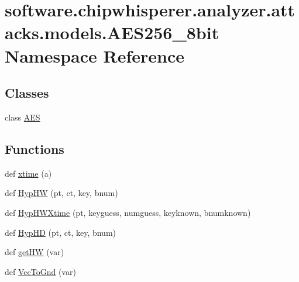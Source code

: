 \hypertarget{namespacesoftware_1_1chipwhisperer_1_1analyzer_1_1attacks_1_1models_1_1AES256__8bit}{}\section{software.\+chipwhisperer.\+analyzer.\+attacks.\+models.\+A\+E\+S256\+\_\+8bit Namespace Reference}
\label{namespacesoftware_1_1chipwhisperer_1_1analyzer_1_1attacks_1_1models_1_1AES256__8bit}
\subsection*{Classes}
\begin{DoxyCompactItemize}
\item 
class \hyperlink{classsoftware_1_1chipwhisperer_1_1analyzer_1_1attacks_1_1models_1_1AES256__8bit_1_1AES}{A\+E\+S}
\end{DoxyCompactItemize}
\subsection*{Functions}
\begin{DoxyCompactItemize}
\item 
def \hyperlink{namespacesoftware_1_1chipwhisperer_1_1analyzer_1_1attacks_1_1models_1_1AES256__8bit_a096a7aee640b9fd3b4af6bd8e2bdb892}{xtime} (a)
\item 
def \hyperlink{namespacesoftware_1_1chipwhisperer_1_1analyzer_1_1attacks_1_1models_1_1AES256__8bit_aeed3429f331415549b3d6a0df13a3f00}{Hyp\+H\+W} (pt, ct, key, bnum)
\item 
def \hyperlink{namespacesoftware_1_1chipwhisperer_1_1analyzer_1_1attacks_1_1models_1_1AES256__8bit_a1fc9d650283b04236c62962864126fe0}{Hyp\+H\+W\+Xtime} (pt, keyguess, numguess, keyknown, bnumknown)
\item 
def \hyperlink{namespacesoftware_1_1chipwhisperer_1_1analyzer_1_1attacks_1_1models_1_1AES256__8bit_a6d73aa3d64074fad4ae5cda6a45e9586}{Hyp\+H\+D} (pt, ct, key, bnum)
\item 
def \hyperlink{namespacesoftware_1_1chipwhisperer_1_1analyzer_1_1attacks_1_1models_1_1AES256__8bit_a50327d92ebe040ca49b25774be351e22}{get\+H\+W} (var)
\item 
def \hyperlink{namespacesoftware_1_1chipwhisperer_1_1analyzer_1_1attacks_1_1models_1_1AES256__8bit_a3c0ffc0bcc173d3bec6f77e480ac6075}{Vcc\+To\+Gnd} (var)
\end{DoxyCompactItemize}
